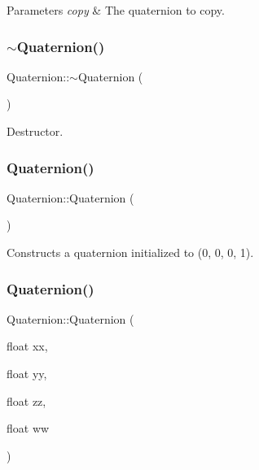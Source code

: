 \begin{DoxyParams}{Parameters}
{\em copy} & The quaternion to copy. \\
\hline
\end{DoxyParams}
\mbox{\label{classQuaternion_a5f834c2ca469cd71edc8a23fdc3f56e8}} 
\subsubsection{\texorpdfstring{$\sim$\+Quaternion()}{~Quaternion()}\hspace{0.1cm}{\footnotesize\ttfamily [1/2]}}
{\footnotesize\ttfamily Quaternion\+::$\sim$\+Quaternion (\begin{DoxyParamCaption}{ }\end{DoxyParamCaption})}

Destructor. \mbox{\label{classQuaternion_abcc01358aada56ea5f0db4da18aaf77d}} 
\subsubsection{\texorpdfstring{Quaternion()}{Quaternion()}\hspace{0.1cm}{\footnotesize\ttfamily [7/12]}}
{\footnotesize\ttfamily Quaternion\+::\+Quaternion (\begin{DoxyParamCaption}{ }\end{DoxyParamCaption})}

Constructs a quaternion initialized to (0, 0, 0, 1). \mbox{\label{classQuaternion_a4dcf5b1a3c937b45a0d38ccd4ad6945f}} 
\subsubsection{\texorpdfstring{Quaternion()}{Quaternion()}\hspace{0.1cm}{\footnotesize\ttfamily [8/12]}}
{\footnotesize\ttfamily Quaternion\+::\+Quaternion (\begin{DoxyParamCaption}\item[{float}]{xx,  }\item[{float}]{yy,  }\item[{float}]{zz,  }\item[{float}]{ww }\end{DoxyParamCaption})}

